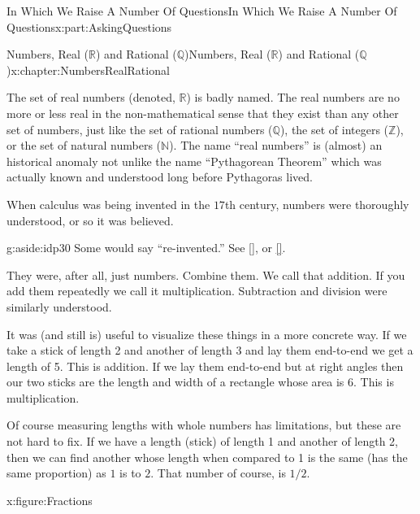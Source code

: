 \documentclass[oneside,10pt,]{book}
\newcommand{\xreffont}{\relax}
\numberwithin{equation}{section}
\newcommand{\RR}{\mathbb {R}}
\newcommand{\QQ}{\mathbb {Q}}
\newcommand{\NN}{\mathbb {N}}
\newcommand{\ZZ}{\mathbb {Z}}
\begin{document}
\begin{partptx}{In Which We Raise A Number Of Questions}{}{In Which We Raise A Number Of Questions}{}{}{x:part:AskingQuestions}
%
\typeout{************************************************}
\typeout{Chapter 3 Numbers, Real (\(\RR\)) and Rational (\(\QQ\))}
\typeout{************************************************}
%
\begin{chapterptx}{Numbers, Real (\(\RR\)) and Rational (\(\QQ\))}{}{Numbers, Real (\(\RR\)) and Rational (\(\QQ\))}{}{}{x:chapter:NumbersRealRational}
\begin{introduction}{}%
The set of real numbers (denoted, \(\RR\)) is badly named. The real numbers are no more or less real \textemdash{} in the non-mathematical sense that they exist \textemdash{} than any other set of numbers, just like the set of rational numbers (\(\QQ\)), the set of integers (\(\ZZ\)), or the set of natural numbers (\(\NN\)). The name ``real numbers'' is (almost) an historical anomaly not unlike the name ``Pythagorean Theorem'' which was actually known and understood long before Pythagoras lived.%
\par
When calculus was being invented in the \(17\)th century, numbers were thoroughly understood, or so it was believed.%
\begin{aside}{}{g:aside:idp30}%
Some would say ``re-invented.'' See \hyperlink{x:biblio:russo96__forgot_revol}{[{\xreffont 13}]}, or \hyperlink{x:biblio:netz07__archim_codex}{[{\xreffont 9}]}.  %
\end{aside}
They were, after all, just numbers. Combine them. We call that addition. If you add them repeatedly we call it multiplication. Subtraction and division were similarly understood.%
\par
It was (and still is) useful to visualize these things in a more concrete way. If we take a stick of length 2 and another of length 3 and lay them end-to-end we get a length of 5. This is addition. If we lay them end-to-end but at right angles then our two sticks are the length and width of a rectangle whose area is 6. This is multiplication.%
\par
Of course measuring lengths with whole numbers has limitations, but these are not hard to fix. If we have a length (stick) of length 1 and another of length 2, then we can find another whose length when compared to 1 is the same (has the same proportion) as \(1\) is to \(2\). That number of course, is \(1/2\).%
\begin{figureptx}{}{x:figure:Fractions}{}%
\begin{image}{0.125}{0.75}{0.125}%

\end{image}
\end{figureptx}
\end{introduction}
\end{chapterptx}
\end{partptx}
\end{document}
